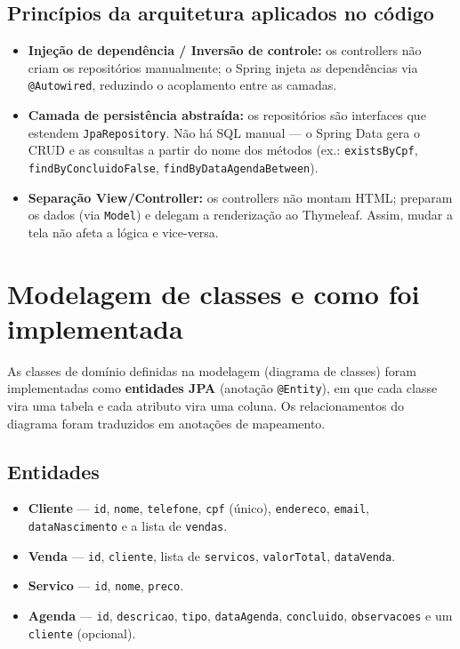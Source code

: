 \documentclass[12pt,a4paper]{article}
\newcommand{\code}[1]{\texttt{#1}}
\begin{document}
\subsection{Princípios da arquitetura aplicados no código}
\begin{itemize}[leftmargin=*]
  \item \textbf{Injeção de dependência / Inversão de controle:} os controllers não
        criam os repositórios manualmente; o Spring injeta as dependências via
        \code{@Autowired}, reduzindo o acoplamento entre as camadas.
  \item \textbf{Camada de persistência abstraída:} os repositórios são interfaces que
        estendem \code{JpaRepository}. Não há SQL manual --- o Spring Data gera o CRUD
        e as consultas a partir do nome dos métodos (ex.: \code{existsByCpf},
        \code{findByConcluidoFalse}, \code{findByDataAgendaBetween}).
  \item \textbf{Separação View/Controller:} os controllers não montam HTML; preparam
        os dados (via \code{Model}) e delegam a renderização ao Thymeleaf. Assim,
        mudar a tela não afeta a lógica e vice-versa.
\end{itemize}

\section{Modelagem de classes e como foi implementada}

As classes de domínio definidas na modelagem (diagrama de classes) foram
implementadas como \textbf{entidades JPA} (anotação \code{@Entity}), em que cada
classe vira uma tabela e cada atributo vira uma coluna. Os relacionamentos do
diagrama foram traduzidos em anotações de mapeamento.

\subsection{Entidades}
\begin{itemize}[leftmargin=*]
  \item \textbf{Cliente} --- \code{id}, \code{nome}, \code{telefone}, \code{cpf}
        (único), \code{endereco}, \code{email}, \code{dataNascimento} e a lista de
        \code{vendas}.
  \item \textbf{Venda} --- \code{id}, \code{cliente}, lista de \code{servicos},
        \code{valorTotal}, \code{dataVenda}.
  \item \textbf{Servico} --- \code{id}, \code{nome}, \code{preco}.
  \item \textbf{Agenda} --- \code{id}, \code{descricao}, \code{tipo},
        \code{dataAgenda}, \code{concluido}, \code{observacoes} e um \code{cliente}
        (opcional).
\end{itemize}
\end{document}
